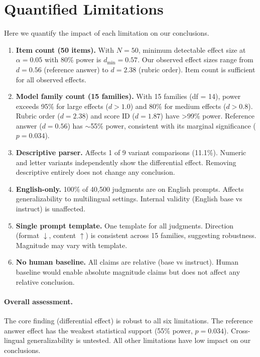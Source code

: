 \section{Quantified Limitations}

Here we quantify the impact of each limitation on our conclusions.

\begin{enumerate}
    \item \textbf{Item count (50 items).} With $N=50$, minimum detectable effect size at $\alpha=0.05$ with 80\% power is $d_{\min}=0.57$. Our observed effect sizes range from $d=0.56$ (reference answer) to $d=2.38$ (rubric order). Item count is sufficient for all observed effects.
    
    \item \textbf{Model family count (15 families).} With 15 families (df = 14), power exceeds 95\% for large effects ($d>1.0$) and 80\% for medium effects ($d>0.8$). Rubric order ($d=2.38$) and score ID ($d=1.87$) have >99\% power. Reference answer ($d=0.56$) has $\sim$55\% power, consistent with its marginal significance ($p=0.034$).
    
    \item \textbf{Descriptive parser.} Affects 1 of 9 variant comparisons (11.1\%). Numeric and letter variants independently show the differential effect. Removing descriptive entirely does not change any conclusion.
    
    \item \textbf{English-only.} 100\% of 40,500 judgments are on English prompts. Affects generalizability to multilingual settings. Internal validity (English base vs instruct) is unaffected.
    
    \item \textbf{Single prompt template.} One template for all judgments. Direction (format $\downarrow$, content $\uparrow$) is consistent across 15 families, suggesting robustness. Magnitude may vary with template.
    
    \item \textbf{No human baseline.} All claims are relative (base vs instruct). Human baseline would enable absolute magnitude claims but does not affect any relative conclusion.
\end{enumerate}

\paragraph{Overall assessment.} The core finding (differential effect) is robust to all six limitations. The reference answer effect has the weakest statistical support (55\% power, $p=0.034$). Cross-lingual generalizability is untested. All other limitations have low impact on our conclusions.
